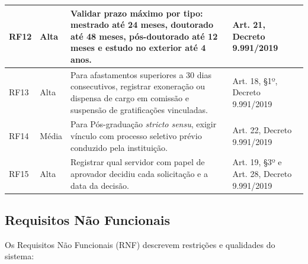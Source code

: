 \begin{longtable}{|p{1.8cm}|p{1.8cm}|p{6.5cm}|p{4cm}|}
RF12 & Alta & Validar prazo máximo por tipo: mestrado até 24 meses, doutorado até 48 meses, pós-doutorado até 12 meses e estudo no exterior até 4 anos. & Art. 21, Decreto 9.991/2019 \\ \hline
RF13 & Alta & Para afastamentos superiores a 30 dias consecutivos, registrar exoneração ou dispensa de cargo em comissão e suspensão de gratificações vinculadas. & Art. 18, §1º, Decreto 9.991/2019 \\ \hline
RF14 & Média & Para Pós-graduação \textit{stricto sensu}, exigir vínculo com processo seletivo prévio conduzido pela instituição. & Art. 22, Decreto 9.991/2019 \\ \hline
RF15 & Alta & Registrar qual servidor com papel de aprovador decidiu cada solicitação e a data da decisão. & Art. 19, §3º e Art. 28, Decreto 9.991/2019 \\ \hline

\end{longtable}

\subsection{Requisitos Não Funcionais}
Os Requisitos Não Funcionais (RNF) descrevem restrições e qualidades do sistema:

